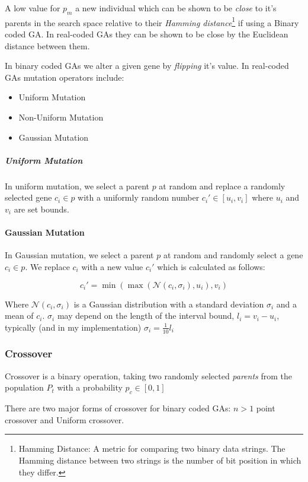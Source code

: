 A low value for $p_m$ a new individual which can be shown to be \textit{close} to it's parents in the search space relative to their \textit{Hamming distance}\footnote{Hamming Distance: A metric for comparing two binary data strings. The Hamming distance between two strings is the number of bit position in which they differ.} if using a Binary coded GA. In real-coded GAs they can be shown to be close by the Euclidean distance between them.

In binary coded GAs we alter a given gene by \textit{flipping} it's value.
In real-coded GAs mutation operators include: 
\begin{itemize}
    \item Uniform Mutation
    \item Non-Uniform Mutation
    \item Gaussian Mutation 
\end{itemize}
\subparagraph{Uniform Mutation}
In uniform mutation, we select a parent $p$ at random and replace a randomly selected gene $c_i \in p$ with a uniformly random number $c_i' \in [u_i,v_i]$  where $u_i$ and $v_i$ are set bounds.

\paragraph{Gaussian Mutation}

In Gaussian mutation, we select a parent $p$ at random and randomly select a gene $c_{i} \in p$. We replace $c_{i}$ with a new value $c_{i}'$ which is calculated as follows:

\begin{equation}
  c_{i}' = \min(\max(\mathcal{N}(c_{i},\sigma_{i}), u_{i}), v_{i})
\end{equation}

Where $\mathcal{N}(c_{i},\sigma_{i})$ is a Gaussian distribution with a standard deviation \(\sigma_{i}\) and a mean of $c_{i}$. \(\sigma_{i}\) may depend on the length of the interval bound, $l_{i} = v_{i} - u_{i}$, typically (and in my implementation) $\sigma_{i} = \frac{1}{10}l_{i}$


\subsubsection{Crossover}

Crossover is a binary operation, taking two randomly selected \textit{parents} from the population $P_t$ with a probability $p_c \in [0,1]$ 

There are two major forms of crossover for binary coded GAs: $n>1$ point crossover and Uniform crossover. 

